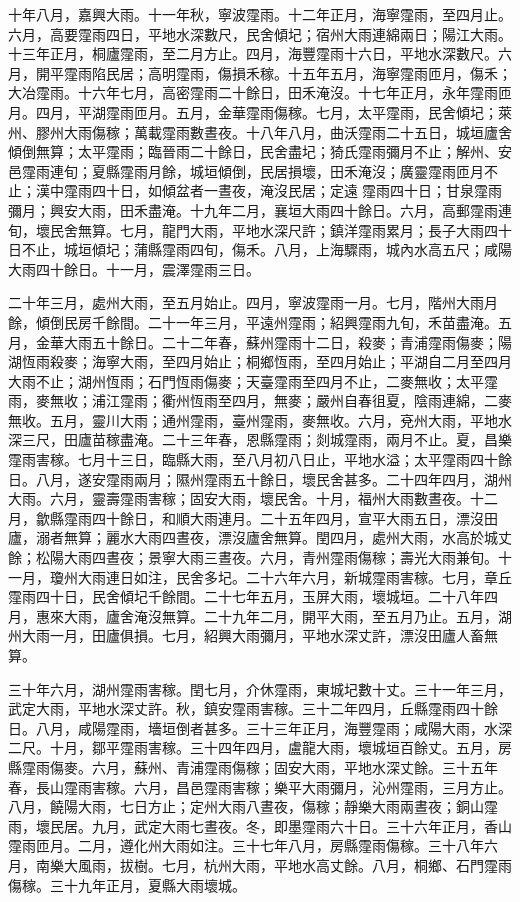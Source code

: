 \begin{pinyinscope}
十年八月，嘉興大雨。十一年秋，寧波霪雨。十二年正月，海寧霪雨，至四月止。六月，高要霪雨四日，平地水深數尺，民舍傾圮；宿州大雨連綿兩日；陽江大雨。十三年正月，桐廬霪雨，至二月方止。四月，海豐霪雨十六日，平地水深數尺。六月，開平霪雨陷民居；高明霪雨，傷損禾稼。十五年五月，海寧霪雨匝月，傷禾；大冶霪雨。十六年七月，高密霪雨二十餘日，田禾淹沒。十七年正月，永年霪雨匝月。四月，平湖霪雨匝月。五月，金華霪雨傷稼。七月，太平霪雨，民舍傾圮；萊州、膠州大雨傷稼；萬載霪雨數晝夜。十八年八月，曲沃霪雨二十五日，城垣廬舍傾倒無算；太平霪雨；臨晉雨二十餘日，民舍盡圮；猗氏霪雨彌月不止；解州、安邑霪雨連旬；夏縣霪雨月餘，城垣傾倒，民居損壞，田禾淹沒；廣靈霪雨匝月不止；漢中霪雨四十日，如傾盆者一晝夜，淹沒民居；定遠霪雨四十日；甘泉霪雨彌月；興安大雨，田禾盡淹。十九年二月，襄垣大雨四十餘日。六月，高郵霪雨連旬，壞民舍無算。七月，龍門大雨，平地水深尺許；鎮洋霪雨累月；長子大雨四十日不止，城垣傾圮；蒲縣霪雨四旬，傷禾。八月，上海驟雨，城內水高五尺；咸陽大雨四十餘日。十一月，震澤霪雨三日。

二十年三月，處州大雨，至五月始止。四月，寧波霪雨一月。七月，階州大雨月餘，傾倒民房千餘間。二十一年三月，平遠州霪雨；紹興霪雨九旬，禾苗盡淹。五月，金華大雨五十餘日。二十二年春，蘇州霪雨十二日，殺麥；青浦霪雨傷麥；陽湖恆雨殺麥；海寧大雨，至四月始止；桐鄉恆雨，至四月始止；平湖自二月至四月大雨不止；湖州恆雨；石門恆雨傷麥；天臺霪雨至四月不止，二麥無收；太平霪雨，麥無收；浦江霪雨；衢州恆雨至四月，無麥；嚴州自春徂夏，陰雨連綿，二麥無收。五月，靈川大雨；通州霪雨，臺州霪雨，麥無收。六月，兗州大雨，平地水深三尺，田廬苗稼盡淹。二十三年春，恩縣霪雨；剡城霪雨，兩月不止。夏，昌樂霪雨害稼。七月十三日，臨縣大雨，至八月初八日止，平地水溢；太平霪雨四十餘日。八月，遂安霪雨兩月；隰州霪雨五十餘日，壞民舍甚多。二十四年四月，湖州大雨。六月，靈壽霪雨害稼；固安大雨，壞民舍。十月，福州大雨數晝夜。十二月，歙縣霪雨四十餘日，和順大雨連月。二十五年四月，宣平大雨五日，漂沒田廬，溺者無算；麗水大雨四晝夜，漂沒廬舍無算。閏四月，處州大雨，水高於城丈餘；松陽大雨四晝夜；景寧大雨三晝夜。六月，青州霪雨傷稼；壽光大雨兼旬。十一月，瓊州大雨連日如注，民舍多圮。二十六年六月，新城霪雨害稼。七月，章丘霪雨四十日，民舍傾圮千餘間。二十七年五月，玉屏大雨，壞城垣。二十八年四月，惠來大雨，廬舍淹沒無算。二十九年二月，開平大雨，至五月乃止。五月，湖州大雨一月，田廬俱損。七月，紹興大雨彌月，平地水深丈許，漂沒田廬人畜無算。

三十年六月，湖州霪雨害稼。閏七月，介休霪雨，東城圮數十丈。三十一年三月，武定大雨，平地水深丈許。秋，鎮安霪雨害稼。三十二年四月，丘縣霪雨四十餘日。八月，咸陽霪雨，墻垣倒者甚多。三十三年正月，海豐霪雨；咸陽大雨，水深二尺。十月，鄒平霪雨害稼。三十四年四月，盧龍大雨，壞城垣百餘丈。五月，房縣霪雨傷麥。六月，蘇州、青浦霪雨傷稼；固安大雨，平地水深丈餘。三十五年春，長山霪雨害稼。六月，昌邑霪雨害稼；樂平大雨彌月，沁州霪雨，三月方止。八月，饒陽大雨，七日方止；定州大雨八晝夜，傷稼；靜樂大雨兩晝夜；銅山霪雨，壞民居。九月，武定大雨七晝夜。冬，即墨霪雨六十日。三十六年正月，香山霪雨匝月。二月，遵化州大雨如注。三十七年八月，房縣霪雨傷稼。三十八年六月，南樂大風雨，拔樹。七月，杭州大雨，平地水高丈餘。八月，桐鄉、石門霪雨傷稼。三十九年正月，夏縣大雨壞城。


\end{pinyinscope}
